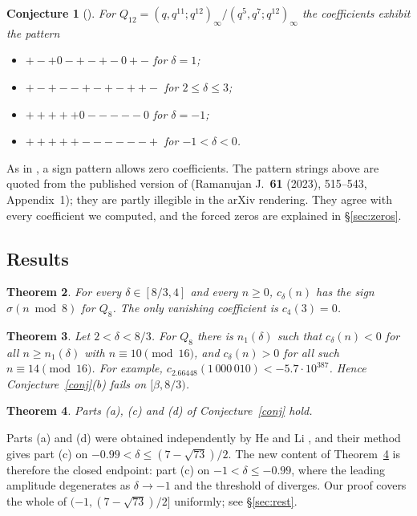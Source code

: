 \documentclass[11pt]{amsart}
\newtheorem{theorem}{Theorem}[section]
\newtheorem{conjecture}[theorem]{Conjecture}
\theoremstyle{remark}
\theoremstyle{definition}
\begin{document}
\begin{conjecture}[{\cite[Conj.~24]{SZ}}]\label{conj24}
For $Q_{12}=(q,q^{11};q^{12})_\infty/(q^5,q^7;q^{12})_\infty$ the coefficients exhibit the pattern
\begin{itemize}[leftmargin=2em]
\item $+-+0-+-+-0+-$ for $\delta=1$;
\item $+-+--+-+-++-$ for $2\le\delta\le3$;
\item $+++++0-----0$ for $\delta=-1$;
\item $+++++------+$ for $-1<\delta<0$.
\end{itemize}
\end{conjecture}

As in \cite{SZ}, a sign pattern allows zero coefficients. The pattern strings above are quoted from the published version of \cite{SZ} (Ramanujan J.\ \textbf{61} (2023), 515--543, Appendix~1); they are partly illegible in the arXiv rendering. They agree with every coefficient we computed, and the forced zeros are explained in \S\ref{sec:zeros}.

\subsection*{Results}
\begin{theorem}\label{thm:A}
For every $\delta\in[8/3,4]$ and every $n\ge0$, $c_\delta(n)$ has the sign $\sigma(n\bmod 8)$ for $Q_8$. The only vanishing coefficient is $c_4(3)=0$.
\end{theorem}

\begin{theorem}\label{thm:B}
Let $2<\delta<8/3$. For $Q_8$ there is $n_1(\delta)$ such that $c_\delta(n)<0$ for all $n\ge n_1(\delta)$ with $n\equiv10\pmod{16}$, and $c_\delta(n)>0$ for all such $n\equiv14\pmod{16}$. For example, $c_{2.66448}(1\,000\,010)<-5.7\cdot10^{387}$. Hence Conjecture~\ref{conj}(b) fails on $[\beta,8/3)$.
\end{theorem}

\begin{theorem}\label{thm:C}
Parts (a), (c) and (d) of Conjecture~\ref{conj} hold.
\end{theorem}

Parts (a) and (d) were obtained independently by He and Li \cite[Thm.~1.4]{HL}, and their
method gives part (c) on $-0.99<\delta\le(7-\sqrt{73})/2$. The new content of
Theorem~\ref{thm:C} is therefore the closed endpoint: part (c) on $-1<\delta\le-0.99$, where the
leading amplitude degenerates as $\delta\to-1$ and the threshold of \cite{HL} diverges. Our proof
covers the whole of $(-1,(7-\sqrt{73})/2]$ uniformly; see \S\ref{sec:rest}.
\end{document}

